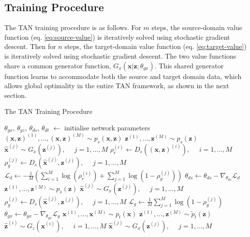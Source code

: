\documentclass{article}
\begin{document}
\subsection{Training Procedure}
The TAN training procedure is as follows. For $m$ steps, the source-domain value function (eq. \ref{eq:source-value}) is iteratively solved using stochastic gradient descent. Then for $n$ steps, the target-domain value function (eq. \ref{eq:target-value}) is iteratively solved using stochastic gradient descent. The two value functions share a common generator function, $G_x(\bm{x}|\bm{z}; \theta_{gx})$. This shared generator function learns to accommodate both the source and target domain data, which allows global optimality in the entire TAN framework, as shown in the next section.
\begin{algorithm}[h!]
   \caption{The TAN Training Procedure}
   \label{alg:example}
\begin{algorithmic}
   \STATE $\theta_{gx}$, $\theta_{gz}$, $\theta_{ds}$, $\theta_{dt}$ $\leftarrow$ initialise network parameters
   \REPEAT
   		\STATE $(\bm{x},\bm{z})^{(1)}, \dots, (\bm{x},\bm{z})^{(M)} \sim p_s(\bm{x},\bm{z})$ 
		\STATE $\bm{z}^{(1)}, \dots, \bm{z}^{(M)} \sim p_s(\bm{z})$
		\STATE $\hat{\bm{x}}^{(j)} \sim G_x \left(\bm{z}^{(j)}\right), \ \ \ \ \ \ j = 1, \dots, M $ 
		\STATE $\rho_r^{(i)} \leftarrow D_s\left((\bm{x},\bm{z})^{(i)}\right), \ \ \ \ \ \ i = 1, \dots, M $ 
		\STATE $\rho_g^{(j)} \leftarrow D_s\left(\hat{\bm{x}}^{(j)}, \bm{z}^{(j)}\right), \ \ \ \ \ \ j = 1, \dots, M $
		\STATE $\mathcal{L}_d \leftarrow -\frac{1}{M} \left( \sum_{i=1}^{M} \log \left( \rho_r^{(i)} \right) + \sum_{j=1}^{M} \log \left( 1 - \rho_g^{(j)} \right) \right)$
		\STATE $\theta_{ds} \leftarrow \theta_{ds} - \nabla_{\theta_{ds}}\mathcal{L}_d$
	\ENDFOR
	\STATE $\bm{z}^{(1)}, \dots, \bm{z}^{(M)} \sim p_s(\bm{z})$
	\STATE $\hat{\bm{x}}^{(j)} \sim G_x \left(\bm{z}^{(j)}\right), \ \ \ \ \ \ j = 1, \dots, M $ 
	\STATE $\rho_g^{(j)} \leftarrow D_s\left(\hat{\bm{x}}^{(j)}, \bm{z}^{(j)}\right), \ \ \ \ \ \ j = 1, \dots, M $
	\STATE $\mathcal{L}_g \leftarrow \frac{1}{M} \sum_{j=1}^{M} \log \left(1 - \rho_g^{(j)} \right)$
	\STATE $\theta_{gx} \leftarrow \theta_{gx} - \nabla_{\theta_{gx}}\mathcal{L}_g$
	\ENDFOR
   	\STATE $\bm{x}^{(1)}, \dots, \bm{x}^{(M)} \sim p_t(\bm{x})$ 
	\STATE $\bm{z}^{(1)}, \dots, \bm{z}^{(M)} \sim \widetilde{p}_t(\bm{z})$
	\STATE $\hat{\bm{z}}^{(i)} \sim G_z \left( \bm{x}^{(i)}\right), \ \ \ \ \ \ i = 1, \dots, M $ 
	\STATE $\hat{\bm{x}}^{(j)} \sim G_x \left( \bm{z}^{(j)}\right), \ \ \ \ \ \ j = 1, \dots, M $

\end{algorithmic}
\end{algorithm}
\end{document}
